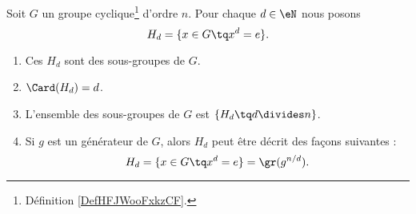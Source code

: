 \begin{theorem}     \label{THOooRGSTooIWyhqt}
    Soit \( G\) un groupe cyclique\footnote{Définition \ref{DefHFJWooFxkzCF}.} d'ordre \( n\). Pour chaque \( d\in \eN\) nous posons
    \begin{equation}
        H_d=\{ x\in G\tq x^d=e \}.
    \end{equation}
	\begin{enumerate}
        \item
            Ces \( H_d\) sont des sous-groupes de \( G\).
        \item
            \( \Card(H_d)=d\).
        \item       \label{ITEMooMJCXooCIWSmK}
            L'ensemble des sous-groupes de \( G\) est \( \{ H_d\tq d\divides n \}\).
        \item     \label{ITEMooIEGUooPQWEep}
	Si \( g\) est un générateur de \( G\), alors \( H_d\) peut être décrit des façons suivantes :
	\begin{equation}
        H_d=\{ x\in G\tq x^d=e \}=\gr(g^{n/d}).
	\end{equation}
	\end{enumerate}
\end{theorem}

